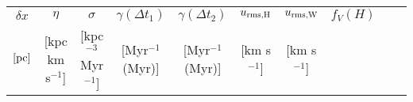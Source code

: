 \documentclass[preprint2]{aastex63}
\begin{document}
\begin{table*}
\begin{tabular}{cccccccccc}
\hline
$\delta x$& $\eta$          & $\sigma$              &$\gamma(\Delta t_1)$&$\gamma(\Delta t_2)$&$u_{\rm rms,H}$ &$u_{\rm rms,W}$ & $f_V(H)$\\
$[\rm pc]$&[kpc km s$^{-1}$]&[kpc$^{-3}$ Myr$^{-1}$]&[Myr$^{-1}$(Myr)]   &[Myr$^{-1}$(Myr)]   & [km s$^{-1}$]  & [km s$^{-1}$]  &\\  
\hline


\end{tabular}
\end{table*}
\end{document}
